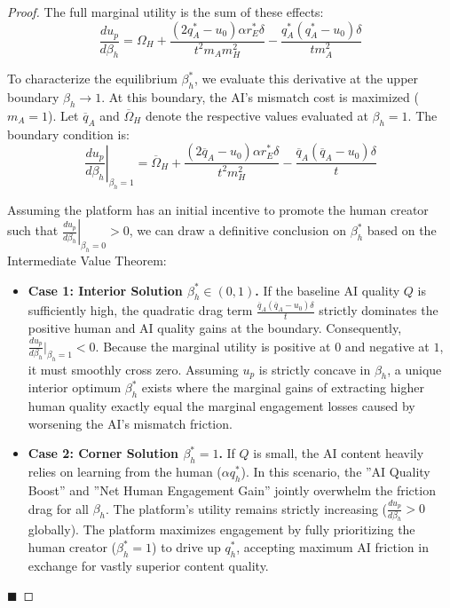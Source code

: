 \documentclass[mnsc,nonblindrev]{informs3_NoOR}
\begin{document}
\begin{proof}
The full marginal utility is the sum of these effects:
\begin{equation}
\frac{du_{p}}{d\beta_{h}} = \Omega_{H} + \frac{(2q_{A}^{*} - u_{0}) \alpha r_{E}^{*} \delta}{t^{2}m_{A}m_{H}^{2}} - \frac{q_{A}^{*}(q_{A}^{*} - u_{0})\delta}{tm_{A}^{2}}
\end{equation}

To characterize the equilibrium $\beta_{h}^{*}$, we evaluate this derivative at the upper boundary $\beta_{h} \to 1$. At this boundary, the AI's mismatch cost is maximized ($m_{A} = 1$). Let $\overline{q}_{A}$ and $\overline{\Omega}_{H}$ denote the respective values evaluated at $\beta_{h} = 1$. The boundary condition is:
\begin{equation}
\left. \frac{du_{p}}{d\beta_{h}} \right|_{\beta_{h}=1} = \overline{\Omega}_{H} + \frac{(2\overline{q}_{A} - u_{0}) \alpha r_{E}^{*} \delta}{t^{2}m_{H}^{2}} - \frac{\overline{q}_{A}(\overline{q}_{A} - u_{0})\delta}{t}
\end{equation}

Assuming the platform has an initial incentive to promote the human creator such that $\left. \frac{du_{p}}{d\beta_{h}} \right|_{\beta_{h}=0} > 0$, we can draw a definitive conclusion on $\beta_{h}^{*}$ based on the Intermediate Value Theorem:

\begin{itemize}
    \item \textbf{Case 1: Interior Solution $\beta_{h}^{*} \in (0, 1)$.} 
    If the baseline AI quality $Q$ is sufficiently high, the quadratic drag term $\frac{\overline{q}_{A}(\overline{q}_{A} - u_{0})\delta}{t}$ strictly dominates the positive human and AI quality gains at the boundary. Consequently, $\frac{du_{p}}{d\beta_{h}} \big|_{\beta_{h}=1} < 0$. Because the marginal utility is positive at $0$ and negative at $1$, it must smoothly cross zero. Assuming $u_{p}$ is strictly concave in $\beta_{h}$, a unique interior optimum $\beta_{h}^{*}$ exists where the marginal gains of extracting higher human quality exactly equal the marginal engagement losses caused by worsening the AI's mismatch friction.
    
    \item \textbf{Case 2: Corner Solution $\beta_{h}^{*} = 1$.}
    If $Q$ is small, the AI content heavily relies on learning from the human ($\alpha q_{h}^{*}$). In this scenario, the ''AI Quality Boost'' and ''Net Human Engagement Gain'' jointly overwhelm the friction drag for all $\beta_{h}$. The platform's utility remains strictly increasing ($\frac{du_{p}}{d\beta_{h}} > 0$ globally). The platform maximizes engagement by fully prioritizing the human creator ($\beta_{h}^{*} = 1$) to drive up $q_{h}^{*}$, accepting maximum AI friction in exchange for vastly superior content quality.
\end{itemize} \hfill $\blacksquare$
\end{proof}
\end{document}

